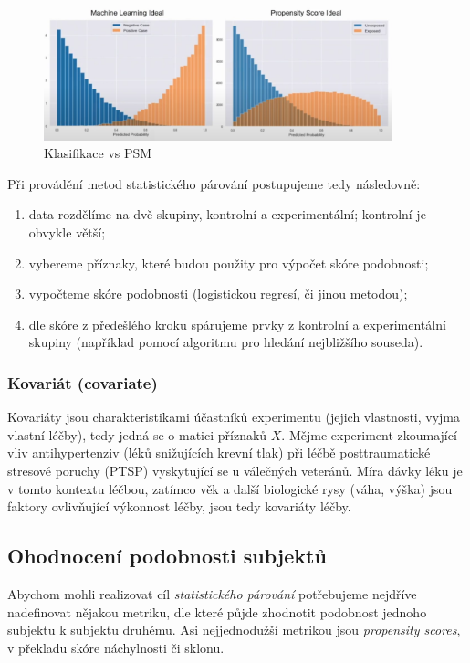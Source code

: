 \begin{figure}[htbp]
	\centering
	\includegraphics[width=0.9\textwidth]{img/psm-vs-class.png}
	\caption{Klasifikace vs PSM}
\end{figure}
\FloatBarrier

Při provádění metod statistického párování postupujeme tedy následovně:

\begin{enumerate}
    \item data rozdělíme na dvě skupiny, kontrolní a experimentální; kontrolní je obvykle větší;
    \item vybereme příznaky, které budou použity pro výpočet skóre podobnosti;
    \item vypočteme skóre podobnosti (logistickou regresí, či jinou metodou);
    \item dle skóre z předešlého kroku spárujeme prvky z kontrolní a experimentální skupiny (například pomocí algoritmu pro hledání nejbližšího souseda).
\end{enumerate}

\subsubsection{Kovariát (covariate)}

Kovariáty jsou charakteristikami účastníků experimentu (jejich vlastnosti, vyjma vlastní léčby), tedy jedná se o matici příznaků \( X \).
Mějme experiment zkoumající vliv antihypertenziv (léků snižujících krevní tlak) při léčbě posttraumatické stresové poruchy (PTSP) vyskytující se u válečných veteránů.
Míra dávky léku je v tomto kontextu léčbou, zatímco věk a další biologické rysy (váha, výška) jsou faktory ovlivňující výkonnost léčby, jsou tedy kovariáty léčby.

\subsection{Ohodnocení podobnosti subjektů}

Abychom mohli realizovat cíl \textit{statistického párování} potřebujeme nejdříve nadefinovat nějakou metriku, dle které půjde zhodnotit podobnost jednoho subjektu k subjektu druhému.
Asi nejjednodužší metrikou jsou \textit{propensity scores}, v překladu skóre náchylnosti či sklonu.

